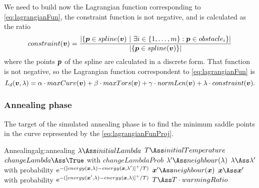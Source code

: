 \documentclass[dissertation.tex]{subfiles}
\begin{document}
We need to build now the Lagrangian function corresponding to
\cref{eq:lagrangianFun}, the constraint function is not negative, and is calculated as the
ratio
\begin{equation*}
constraint(\boldsymbol{v}) = \frac{|\{\boldsymbol{p} \in spline(\boldsymbol{v})\ |\ \exists i\in\{1,\dots,m\}
  : \boldsymbol{p}\in obstacle_i \}|}{|\{\boldsymbol{p} \in spline(\boldsymbol{v})\}|}
\end{equation*}
where the points $\boldsymbol{p}$ of the spline are calculated in a discrete form. That
function is not negative, so the Lagrangian function correspondent to
\cref{eq:lagrangianFun} is
\begin{equation}\label{eq:lagrangianFunProj}
    L_d(\boldsymbol{v},\lambda)=\alpha\cdot maxCurv(\boldsymbol{v})+\beta\cdot
    maxTors(\boldsymbol{v})+\gamma\cdot normLen(\boldsymbol{v})+\lambda\cdot constraint(\boldsymbol{v}).
\end{equation}

\subsubsection{Annealing phase}
The target of the simulated annealing phase is to find the minimum
saddle points in
the curve represented by the
\cref{eq:lagrangianFunProj}.
\begin{algo}{Annealing}{alg:annealing}
  \State $\lambda\Ass initialLambda$\label{alg:annealing:initialize}
  \State $T\Ass initialTemperature$
  \label{alg:annealing:while}
  \label{alg:annealing:for}
  \State $changeLambda\Ass\True$ with $changeLambdaProb$\label{alg:annealing:lambdaProb}
  \State $\lambda'\Ass neighbour(\lambda)$\label{alg:annealing:changeLambda}
  \State $\lambda\Ass \lambda'$ with probability $\mathrm{e}^{-([energy(\boldsymbol{x},\lambda)-energy(\boldsymbol{x},\lambda')]^+/T)}$
  \Else
  \State $\ve{x}'\Ass neighbour(\ve{x})$\label{alg:annealing:changeX}
  \State $\ve{x}\Ass \ve{x}'$ with probability $\mathrm{e}^{-([energy(\boldsymbol{x}',\lambda)-energy(\boldsymbol{x},\lambda)]^+/T)}$
  \EndIf
  \EndFor
  \State $T\Ass T\cdot warmingRatio$\label{alg:annealing:cooling}
  \EndWhile
  \EndProcedure
\end{algo}
\end{document}
